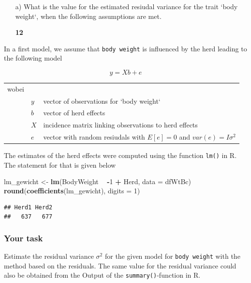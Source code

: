 \documentclass[]{article}
\newenvironment{Shaded}{\begin{snugshade}}{\end{snugshade}}
\newcommand{\KeywordTok}[1]{\textcolor[rgb]{0.13,0.29,0.53}{\textbf{#1}}}
\newcommand{\DataTypeTok}[1]{\textcolor[rgb]{0.13,0.29,0.53}{#1}}
\newcommand{\DecValTok}[1]{\textcolor[rgb]{0.00,0.00,0.81}{#1}}
\newcommand{\StringTok}[1]{\textcolor[rgb]{0.31,0.60,0.02}{#1}}
\newcommand{\OperatorTok}[1]{\textcolor[rgb]{0.81,0.36,0.00}{\textbf{#1}}}
\newcommand{\NormalTok}[1]{#1}
\newcommand{\points}[1]
{\begin{flushright}\textbf{#1}\end{flushright}}
\begin{document}
\begin{enumerate}
\item[a)] What is the value for the estimated resiudal variance for the trait `body weight`, when the following assumptions are met.
\points{12}
\end{enumerate}

In a first model, we assume that \texttt{body\ weight} is influenced by
the herd leading to the following model

\[y = Xb + e\]

\begin{tabular}{lll}
wobei  &  & \\
       &  $y$  &  vector of observations for `body weight` \\
       &  $b$  &  vector of herd effects \\
       &  $X$  &  incidence matrix linking observations to herd effects \\
       &  $e$  &  vector with random resiudals with $E[e] = 0$ and $var(e) = I \sigma^2$
\end{tabular}

The estimates of the herd effects were computed using the function
\texttt{lm()} in R. The statement for that is given below

\begin{Shaded}
\begin{Highlighting}[]
\NormalTok{lm_gewicht <-}\StringTok{ }\KeywordTok{lm}\NormalTok{(BodyWeight }\OperatorTok{~}\StringTok{ }\OperatorTok{-}\DecValTok{1} \OperatorTok{+}\StringTok{ }\NormalTok{Herd, }\DataTypeTok{data =}\NormalTok{ dfWtBc)}
\KeywordTok{round}\NormalTok{(}\KeywordTok{coefficients}\NormalTok{(lm_gewicht), }\DataTypeTok{digits =} \DecValTok{1}\NormalTok{)}
\end{Highlighting}
\end{Shaded}

\begin{verbatim}
## Herd1 Herd2 
##   637   677
\end{verbatim}

\subsubsection{Your task}\label{your-task}

Estimate the residual variance \(\sigma^2\) for the given model for
\texttt{body\ weight} with the method based on the residuals. The same
value for the residual variance could also be obtained from the Output
of the \texttt{summary()}-function in R.
\end{document}
